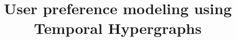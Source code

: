\documentclass[conference]{IEEEtran}
\begin{document}
%
\title{User preference modeling using Temporal Hypergraphs}




% 


\maketitle
\end{document}
